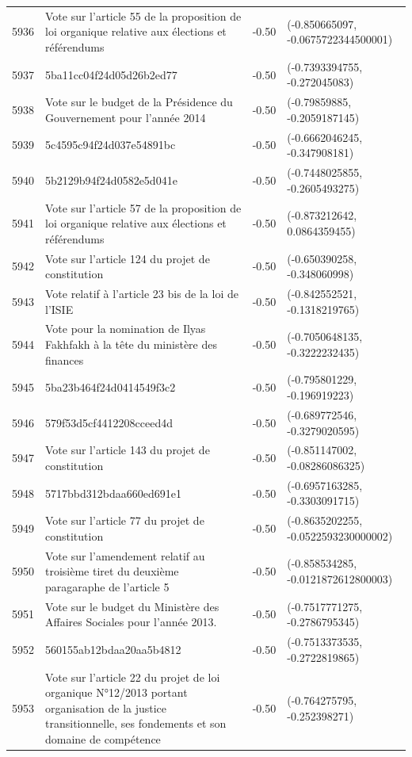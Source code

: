 \begin{table}[ht]
\begin{tabular}{rlrl}
  5936 & Vote sur l'article 55 de la proposition de loi organique relative aux élections et référendums & -0.50 & (-0.850665097, -0.0675722344500001) \\ 
  5937 & 5ba11cc04f24d05d26b2ed77 & -0.50 & (-0.7393394755, -0.272045083) \\ 
  5938 & Vote sur le budget de la Présidence du Gouvernement pour l'année 2014 & -0.50 & (-0.79859885, -0.2059187145) \\ 
  5939 & 5c4595c94f24d037e54891bc & -0.50 & (-0.6662046245, -0.347908181) \\ 
  5940 & 5b2129b94f24d0582e5d041e & -0.50 & (-0.7448025855, -0.2605493275) \\ 
  5941 & Vote sur l'article 57 de la proposition de loi organique relative aux élections et référendums & -0.50 & (-0.873212642, 0.0864359455) \\ 
  5942 & Vote sur l'article 124 du projet de constitution & -0.50 & (-0.650390258, -0.348060998) \\ 
  5943 & Vote relatif à l'article 23 bis de la loi de l'ISIE & -0.50 & (-0.842552521, -0.1318219765) \\ 
  5944 & Vote pour la nomination de Ilyas Fakhfakh à la tête du ministère des finances & -0.50 & (-0.7050648135, -0.3222232435) \\ 
  5945 & 5ba23b464f24d0414549f3c2 & -0.50 & (-0.795801229, -0.196919223) \\ 
  5946 & 579f53d5cf4412208cceed4d & -0.50 & (-0.689772546, -0.3279020595) \\ 
  5947 & Vote sur l'article 143 du projet de constitution & -0.50 & (-0.851147002, -0.08286086325) \\ 
  5948 & 5717bbd312bdaa660ed691e1 & -0.50 & (-0.6957163285, -0.3303091715) \\ 
  5949 & Vote sur l'article 77 du projet de constitution & -0.50 & (-0.8635202255, -0.0522593230000002) \\ 
  5950 & Vote sur l'amendement relatif au troisième tiret du deuxième paragaraphe de l'article 5 & -0.50 & (-0.858534285, -0.0121872612800003) \\ 
  5951 & Vote sur le budget du Ministère des Affaires Sociales pour l'année 2013. & -0.50 & (-0.7517771275, -0.2786795345) \\ 
  5952 & 560155ab12bdaa20aa5b4812 & -0.50 & (-0.7513373535, -0.2722819865) \\ 
  5953 & Vote sur l'article 22 du projet de loi organique N°12/2013 portant organisation de la justice transitionnelle, ses fondements et son domaine de compétence & -0.50 & (-0.764275795, -0.252398271) \\ 

\end{tabular}
\end{table}
